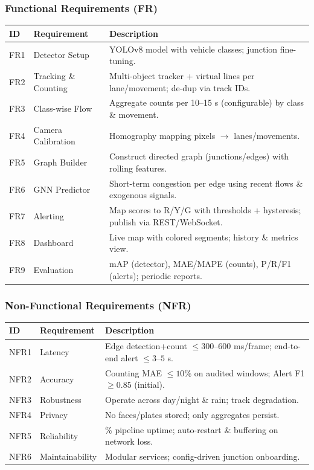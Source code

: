 \subsubsection{Functional Requirements (FR)}
\renewcommand{\arraystretch}{1.15}
\begin{tabularx}{\textwidth}{|>{\raggedright\arraybackslash}p{1.1cm}|>{\raggedright\arraybackslash}p{3.2cm}|>{\raggedright\arraybackslash}X|}
\hline
	\textbf{ID} & \textbf{Requirement} & \textbf{Description} \\
\hline
FR1 & Detector Setup & YOLOv8 model with vehicle classes; junction fine-tuning. \\
\hline
FR2 & Tracking \& Counting & Multi-object tracker + virtual lines per lane/movement; de-dup via track IDs. \\
\hline
FR3 & Class-wise Flow & Aggregate counts per 10--15 s (configurable) by class \& movement. \\
\hline
FR4 & Camera Calibration & Homography mapping pixels $\rightarrow$ lanes/movements. \\
\hline
FR5 & Graph Builder & Construct directed graph (junctions/edges) with rolling features. \\
\hline
FR6 & GNN Predictor & Short-term congestion per edge using recent flows \& exogenous signals. \\
\hline
FR7 & Alerting & Map scores to R/Y/G with thresholds + hysteresis; publish via REST/WebSocket. \\
\hline
FR8 & Dashboard & Live map with colored segments; history \& metrics view. \\
\hline
FR9 & Evaluation & mAP (detector), MAE/MAPE (counts), P/R/F1 (alerts); periodic reports. \\
\hline
\end{tabularx}

\subsubsection{Non-Functional Requirements (NFR)}
\renewcommand{\arraystretch}{1.15}
\begin{tabularx}{\textwidth}{|>{\raggedright\arraybackslash}p{1.1cm}|>{\raggedright\arraybackslash}p{3.2cm}|>{\raggedright\arraybackslash}X|}
\hline
	\textbf{ID} & \textbf{Requirement} & \textbf{Description} \\
\hline
NFR1 & Latency & Edge detection+count $\le 300$--$600$ ms/frame; end-to-end alert $\le 3$--$5$ s. \\
\hline
NFR2 & Accuracy & Counting MAE $\le 10\%$ on audited windows; Alert F1 $\ge 0.85$ (initial). \\
\hline
NFR3 & Robustness & Operate across day/night \& rain; track degradation. \\
\hline
NFR4 & Privacy & No faces/plates stored; only aggregates persist. \\
\hline
NFR5 & Reliability & 99\% pipeline uptime; auto-restart \& buffering on network loss. \\
\hline
NFR6 & Maintainability & Modular services; config-driven junction onboarding. \\
\hline
\end{tabularx}

